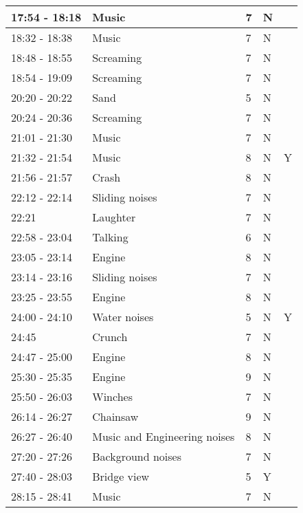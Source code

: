 \begin{longtable}{| p{70pt} | p{130pt} | p{45pt} | p{57pt} | p{60pt}|}
17:54 - 18:18     &     Music     &     7     &     N& \\\hline
18:32 - 18:38     &     Music     &     7     &     N& \\\hline
18:48 - 18:55     &     Screaming     &     7     &     N& \\\hline
18:54 - 19:09     &     Screaming     &     7     &     N& \\\hline
20:20 - 20:22     &     Sand     &     5     &     N& \\\hline
20:24 - 20:36     &     Screaming     &     7     &     N& \\\hline
21:01 - 21:30     &     Music     &     7     &     N& \\\hline
21:32 - 21:54     &     Music     &     8     &     N&Y \\\hline
21:56 - 21:57     &     Crash     &     8     &     N& \\\hline
22:12 - 22:14     &     Sliding noises     &     7     &     N& \\\hline
22:21                  &     Laughter     &     7     &     N& \\\hline
22:58 - 23:04     &     Talking     &     6     &     N& \\\hline
23:05 - 23:14     &     Engine     &     8     &     N& \\\hline
23:14 - 23:16     &     Sliding noises     &     7     &     N& \\\hline
23:25 - 23:55     &     Engine     &     8     &     N& \\\hline
24:00 - 24:10     &     Water noises     &     5     &     N&Y \\\hline
24:45     &     Crunch     &     7     &     N& \\\hline
24:47 - 25:00     &     Engine     &     8     &     N& \\\hline
25:30 - 25:35     &     Engine     &     9     &     N& \\\hline
25:50 - 26:03     &     Winches     &     7     &     N& \\\hline
26:14 - 26:27     &     Chainsaw     &     9     &     N& \\\hline
26:27 - 26:40     &     Music and Engineering noises     &     8     &     N& \\\hline
27:20 - 27:26     &     Background noises     &     7     &     N& \\\hline
27:40 - 28:03     &     Bridge view     &     5     &     Y& \\\hline
28:15 - 28:41     &     Music     &     7     &     N& \\\hline

\end{longtable}
